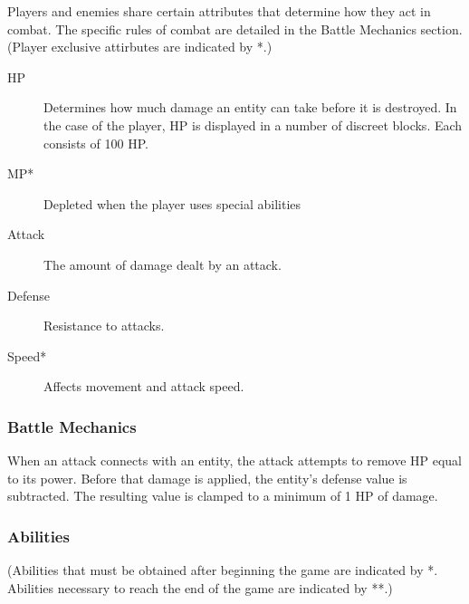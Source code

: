 \documentclass{article}
\begin{document}
Players and enemies share certain attributes that determine how they act in combat.  The specific rules of combat are detailed in the Battle Mechanics section.  (Player exclusive attirbutes are indicated by *.)

\begin{description}

\item[HP]
Determines how much damage an entity can take before it is destroyed.  In the case of the player, HP is displayed in a number of discreet blocks.  Each consists of 100 HP.

\item[MP*]
Depleted when the player uses special abilities

\item[Attack]
The amount of damage dealt by an attack.

\item[Defense]
Resistance to attacks.

\item[Speed*]
Affects movement and attack speed.

\end{description}

\subsubsection{Battle Mechanics}

When an attack connects with an entity, the attack attempts to remove HP equal to its power.  Before that damage is applied, the entity's defense value is subtracted.  The resulting value is clamped to a minimum of 1 HP of damage.


\subsubsection{Abilities}
(Abilities that must be obtained after beginning the game are indicated by *.  Abilities necessary to reach the end of the game are indicated by **.)
\end{document}
